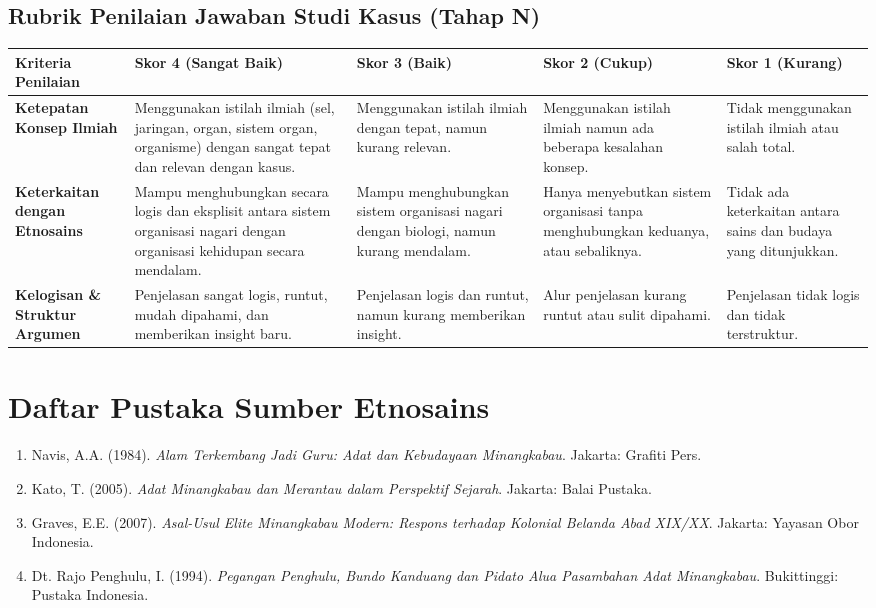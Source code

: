 \documentclass[a4paper,12pt]{article}
\begin{document}
\subsection{Rubrik Penilaian Jawaban Studi Kasus (Tahap N)}

\begin{longtable}{|p{3cm}|p{3cm}|p{3cm}|p{3cm}|p{3cm}|}
\hline
\textbf{Kriteria Penilaian} & \textbf{Skor 4 (Sangat Baik)} & \textbf{Skor 3 (Baik)} & \textbf{Skor 2 (Cukup)} & \textbf{Skor 1 (Kurang)} \\
\hline
\textbf{Ketepatan Konsep Ilmiah} & Menggunakan istilah ilmiah (sel, jaringan, organ, sistem organ, organisme) dengan sangat tepat dan relevan dengan kasus. & Menggunakan istilah ilmiah dengan tepat, namun kurang relevan. & Menggunakan istilah ilmiah namun ada beberapa kesalahan konsep. & Tidak menggunakan istilah ilmiah atau salah total. \\
\hline
\textbf{Keterkaitan dengan Etnosains} & Mampu menghubungkan secara logis dan eksplisit antara sistem organisasi nagari dengan organisasi kehidupan secara mendalam. & Mampu menghubungkan sistem organisasi nagari dengan biologi, namun kurang mendalam. & Hanya menyebutkan sistem organisasi tanpa menghubungkan keduanya, atau sebaliknya. & Tidak ada keterkaitan antara sains dan budaya yang ditunjukkan. \\
\hline
\textbf{Kelogisan \& Struktur Argumen} & Penjelasan sangat logis, runtut, mudah dipahami, dan memberikan insight baru. & Penjelasan logis dan runtut, namun kurang memberikan insight. & Alur penjelasan kurang runtut atau sulit dipahami. & Penjelasan tidak logis dan tidak terstruktur. \\
\hline
\end{longtable}

\section{Daftar Pustaka Sumber Etnosains}

\begin{enumerate}
\item Navis, A.A. (1984). \textit{Alam Terkembang Jadi Guru: Adat dan Kebudayaan Minangkabau}. Jakarta: Grafiti Pers.
\item Kato, T. (2005). \textit{Adat Minangkabau dan Merantau dalam Perspektif Sejarah}. Jakarta: Balai Pustaka.
\item Graves, E.E. (2007). \textit{Asal-Usul Elite Minangkabau Modern: Respons terhadap Kolonial Belanda Abad XIX/XX}. Jakarta: Yayasan Obor Indonesia.
\item Dt. Rajo Penghulu, I. (1994). \textit{Pegangan Penghulu, Bundo Kanduang dan Pidato Alua Pasambahan Adat Minangkabau}. Bukittinggi: Pustaka Indonesia.
\end{enumerate}
\end{document}
